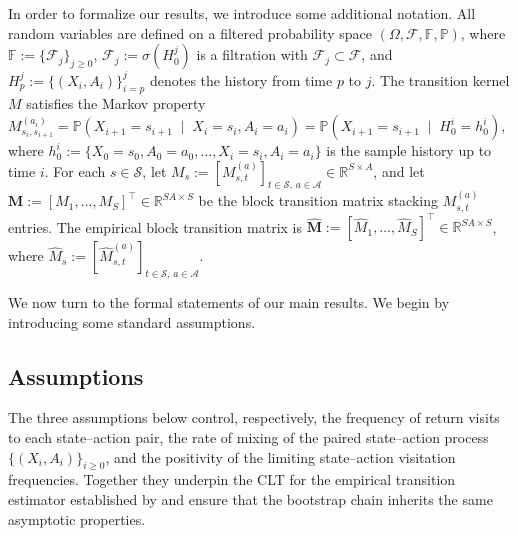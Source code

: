 \documentclass{article}
\numberwithin{equation}{section}
\newcommand{\lp}{\left(}
\newcommand{\rp}{\right)}
\begin{document}
In order to formalize our results, we introduce some additional notation.
All random variables are defined on a filtered probability space $(\Omega,\mathcal{F},\mathbb{F},\mathbb{P})$, where $\mathbb F := \{\mathcal F_j\}_{j \geq 0}$, $\mathcal{F}_j := \sigma(H_0^j)$ is a filtration with $\mathcal F_j \subset \mathcal F$, and $H_p^j := \{(X_i,A_i)\}_{i=p}^j$ denotes the history from time $p$ to $j$.
The transition kernel $M$ satisfies the Markov property $M_{s_i,s_{i+1}}^{(a_i)} = \mathbb P\lp X_{i+1} = s_{i+1} \;\mid\; X_i = s_i, A_i = a_i \rp = \mathbb P \lp X_{i+1} = s_{i+1} \;\mid\; H_0^i = h_0^i \rp$,
where $h_0^i := \{X_0=s_0, A_0=a_0, \ldots, X_i=s_i, A_i=a_i\}$ is the sample history up to time $i$.
For each $s\in\mathcal{S}$, let $M_s := [M^{(a)}_{s,t}]_{t\in\mathcal{S},\,a\in\mathcal{A}} \in \mathbb{R}^{S\times A}$, and let $\mathbf{M} := [M_1,\dots,M_S]^\top \in \mathbb{R}^{SA\times S}$ be the block transition matrix stacking $M_{s,t}^{(a)}$ entries.
The empirical block transition matrix is $\hat{\mathbf{M}} := [\hat M_1,\dots,\hat M_S]^\top \in \mathbb{R}^{SA\times S}$, where $\hat M_s := [\hat M^{(a)}_{s,t}]_{t\in\mathcal{S},\,a\in\mathcal{A}}$.

We now turn to the formal statements of our main results.
We begin by introducing some standard assumptions.

\subsection{Assumptions}
\label{sec:assumptions}

The three assumptions below control, respectively, the frequency of return visits to each state--action pair, the rate of mixing of the paired state--action process $\{(X_i,A_i)\}_{i\ge 0}$, and the positivity of the limiting state--action visitation frequencies. Together they underpin the CLT for the empirical transition estimator established by \citet{su2025centrallimittheoremstransition} and ensure that the bootstrap chain inherits the same asymptotic properties.
\end{document}
